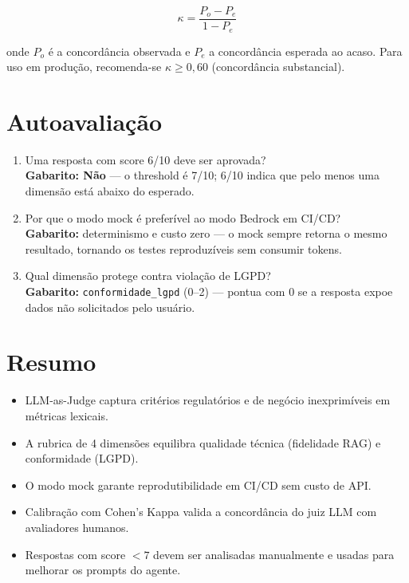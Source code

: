 $$\kappa = \frac{P_o - P_e}{1 - P_e}$$

onde $P_o$ \'e a concord\^ancia observada e $P_e$ a concord\^ancia
esperada ao acaso. Para uso em produ\c{c}\~ao, recomenda-se
$\kappa \geq 0{,}60$ (concord\^ancia substancial).

\section{Autoavalia\c{c}\~ao}

\begin{enumerate}[leftmargin=*]
  \item Uma resposta com score 6/10 deve ser aprovada?\\
        \textbf{Gabarito: N\~ao} --- o threshold \'e 7/10; 6/10
        indica que pelo menos uma dimens\~ao est\'a abaixo do
        esperado.

  \item Por que o modo mock \'e prefer\'ivel ao modo Bedrock em CI/CD?\\
        \textbf{Gabarito:} determinismo e custo zero --- o mock
        sempre retorna o mesmo resultado, tornando os testes
        reproduz\'iveis sem consumir tokens.

  \item Qual dimens\~ao protege contra viola\c{c}\~ao de LGPD?\\
        \textbf{Gabarito:} \texttt{conformidade\_lgpd}
        (0--2) --- pontua com 0 se a resposta expoe dados n\~ao
        solicitados pelo usu\'ario.
\end{enumerate}

\section{Resumo}

\begin{itemize}[leftmargin=*]
  \item LLM-as-Judge captura crit\'erios regulat\'orios e de
        neg\'ocio inexprim\'iveis em m\'etricas lexicais.
  \item A rubrica de 4 dimens\~oes equilibra qualidade t\'ecnica
        (fidelidade RAG) e conformidade (LGPD).
  \item O modo mock garante reprodutibilidade em CI/CD sem custo
        de API.
  \item Calibra\c{c}\~ao com Cohen's Kappa valida a concord\^ancia
        do juiz LLM com avaliadores humanos.
  \item Respostas com score $< 7$ devem ser analisadas
        manualmente e usadas para melhorar os prompts do agente.
\end{itemize}

